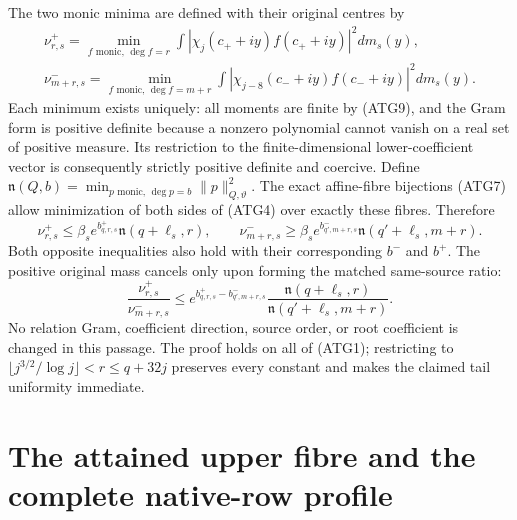 The two monic minima are defined with their original centres by
\[
\begin{gathered}
 \nu^+_{r,s}=\min_{f\text{ monic},\,\deg f=r}
       \int|\chi_j(c_++iy)f(c_++iy)|^2dm_s(y),\\
 \nu^-_{m+r,s}=\min_{f\text{ monic},\,\deg f=m+r}
       \int|\chi_{j-8}(c_-+iy)f(c_-+iy)|^2dm_s(y).
\end{gathered}
\tag{ATG26}
\]
Each minimum exists uniquely: all moments are finite by (ATG9),
and the Gram form is positive definite because a nonzero polynomial
cannot vanish on a real set of positive measure. Its restriction to
the finite-dimensional lower-coefficient vector is consequently
strictly positive definite and coercive.
Define
$\mathfrak n(Q,b)=\min_{p\text{ monic},\,\deg p=b}
\|p\|_{Q,\vartheta}^2$.
The exact affine-fibre bijections (ATG7) allow minimization of both
sides of (ATG4) over exactly these fibres. Therefore
\[
\boxed{
 \nu^+_{r,s}\le\beta_s e^{b^+_{q,r,s}}
                       \mathfrak n(q+\ell_s,r),\qquad
 \nu^-_{m+r,s}\ge\beta_s e^{b^-_{q',m+r,s}}
                       \mathfrak n(q'+\ell_s,m+r).
}
\tag{ATG27}
\]
Both opposite inequalities also hold with their corresponding
$b^-$ and $b^+$. The positive original mass cancels only upon
forming the matched same-source ratio:
\[
 \frac{\nu^+_{r,s}}{\nu^-_{m+r,s}}
 \le e^{b^+_{q,r,s}-b^-_{q',m+r,s}}
       \frac{\mathfrak n(q+\ell_s,r)}
            {\mathfrak n(q'+\ell_s,m+r)}.
\tag{ATG28}
\]
No relation Gram, coefficient direction, source order, or root
coefficient is changed in this passage. The proof holds on all of
(ATG1); restricting to
$\lfloor j^{3/2}/\log j\rfloor<r\le q+32j$ preserves every
constant and makes the claimed tail uniformity immediate.


\begingroup
\section{The attained upper fibre and the complete native-row profile}
\label{sec:ATA}

